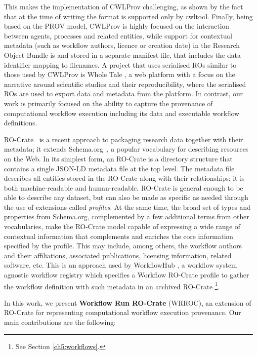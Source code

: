 This makes the implementation of CWLProv challenging, as shown by the fact that at the time of writing the format is supported only by cwltool.
Finally, being based on the PROV model, CWLProv is highly focused on the interaction between agents, processes and related entities, while support for contextual metadata (such as workflow authors, licence or creation date) in the Research Object Bundle is  and stored in a separate manifest file, that includes the data identifier mapping to filenames.
A project that uses serialised ROs similar to those used by CWLProv is Whole Tale \cite{Chard 2019}, a web platform with a focus on the narrative around scientific studies and their reproducibility, where the serialised ROs are used to export data and metadata from the platform. In contrast, our work is primarily focused on the ability to capture the provenance of computational workflow execution including its data and executable workflow definitions.

RO-Crate~\cite{Soiland-Reyes 2022a} is a recent approach to packaging research data together with their metadata; it extends Schema.org~\cite{Guha 2015}, a popular vocabulary for describing resources on the Web.
In its simplest form, an RO-Crate is a directory structure that contains a single JSON-LD \cite{Sporny 2020} metadata file at the top level.
The metadata file describes all entities stored in the RO-Crate along with their relationships; it is both machine-readable and human-readable.
RO-Crate is general enough to be able to describe any dataset, but can also be made as specific as needed through the use of extensions called
\emph{profiles}.
At the same time, the broad set of types and properties from Schema.org, complemented by a few additional terms from other vocabularies, make the RO-Crate model capable of expressing a wide range of contextual information that complements and enriches the core information specified by the profile.
This may include, among others, the workflow authors and their affiliations, associated publications, licensing information, related software, etc.
This is an approach used by WorkflowHub \cite{Goble 2021}, a workflow system agnostic workflow registry which specifies a Workflow RO-Crate profile \cite{Bacall 2022} to gather the workflow definition with such metadata in an archived RO-Crate \footnote{See Section \vref{ch5:workflows}.}. 

In this work, we present \textbf{Workflow Run RO-Crate} (\acrshort{WRROC}), an extension of RO-Crate for representing computational workflow execution provenance.
Our main contributions are the following:

